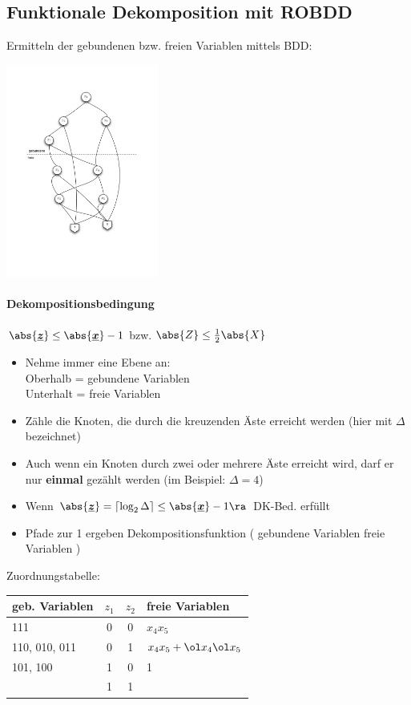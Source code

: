 \documentclass[6pt,a4paper]{scrartcl}
\renewcommand{\emph}[1]{\textsf{\textbf{#1}}}
\renewcommand{\vec}[1]{\ensuremath{\underline{\boldsymbol {#1}}}}
\renewcommand{\vec}[1]{\ensuremath{\underline{\boldsymbol {#1}}}}
\begin{document}
\begin{multicols}{3}
\subsection{Funktionale Dekomposition mit ROBDD}
Ermitteln der gebundenen bzw. freien Variablen mittels BDD: \\
\parbox{2.7cm}{ \includegraphics[width = 5cm]{./img/eds/fdk.pdf} }
\paragraph{Dekompositionsbedingung} %
$\abs{\vec z} \le \abs{\vec x} - 1$ bzw. $\abs{Z} \le \frac{1}{2} \abs{X}$ \\
\begin{itemize}
	\item Nehme immer eine Ebene an:\\
	Oberhalb = gebundene Variablen \\ 
	Unterhalt = freie Variablen
	\item Zähle die Knoten, die durch die kreuzenden Äste erreicht werden (hier mit $\Delta$ bezeichnet)
	\item Auch wenn ein Knoten durch zwei oder mehrere Äste erreicht wird, darf er nur \emph{einmal} gezählt werden (im Beispiel: $\Delta = 4$)
	\item Wenn $\abs{\vec z} = \lceil \log_2 \Delta \rceil \le \abs{\vec{x}} - 1 \ra$ DK-Bed. erfüllt
	\item Pfade zur 1 ergeben Dekompositionsfunktion ( gebundene Variablen \ra freie Variablen )
\end{itemize}
Zuordnungstabelle:\\
\begin{tabular}{l|cc|l}
geb. Variablen & $z_1$ & $z_2$ & freie Variablen \\ \midrule
111 & 0 & 0 & $x_4 x_5$ \\
110, 010, 011 & 0 & 1 & $x_4 x_5 + \ol x_4 \ol x_5$ \\
101, 100 & 1 & 0 & 1 \\
& 1&1& \\
\end{tabular}


\end{multicols}
\end{document}
